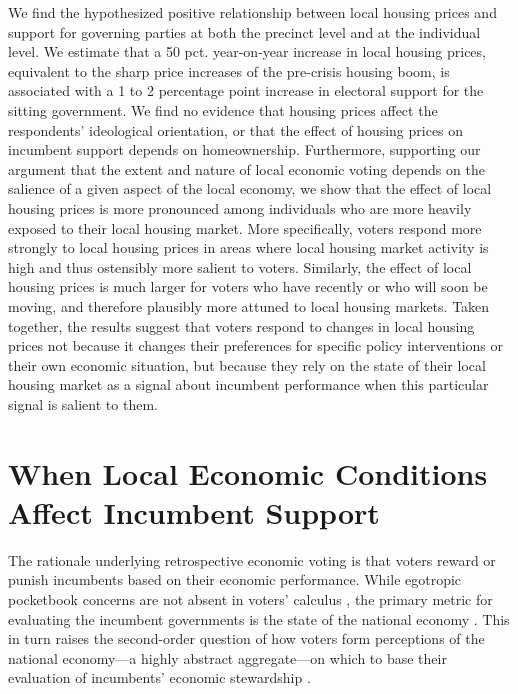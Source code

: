 \documentclass[12pt,a4paper]{article}
\begin{document}
	We find the hypothesized positive relationship between local housing prices and support for governing parties at both the precinct level and at the individual level. We estimate that a 50 pct. year-on-year increase in local housing prices, equivalent to the sharp price increases of the pre-crisis housing boom, is associated with a 1 to 2 percentage point increase in electoral support for the sitting government. We find no evidence that housing prices affect the respondents’ ideological orientation, or that the effect of housing prices on incumbent support depends on homeownership. Furthermore, supporting our argument that the extent and nature of local economic voting depends on the salience of a given aspect of the local economy, we show that the effect of local housing prices is more pronounced among individuals who are more heavily exposed to their local housing market. More specifically, voters respond more strongly to local housing prices in areas where local housing market activity is high and thus ostensibly more salient to voters. Similarly, the effect of local housing prices is much larger for voters who have recently or who will soon be moving, and therefore plausibly more attuned to local housing markets. Taken together, the results suggest that voters respond to changes in local housing prices not because it changes their preferences for specific policy interventions or their own economic situation, but because they rely on the state of their local housing market as a signal about incumbent performance when this particular signal is salient to them.
	
	\section{When Local Economic Conditions Affect Incumbent Support}
	The rationale underlying retrospective economic voting is that voters reward or punish incumbents based on their economic performance. While egotropic pocketbook concerns are not absent in voters’ calculus \citep{healy2017digging, tilley2017pound}, the primary metric for evaluating the incumbent governments is the state of the national economy \citep{kinder1979economic,lewis2013vp}. This in turn raises the second-order question of how voters form perceptions of the national economy—a highly abstract aggregate—on which to base their evaluation of incumbents’ economic stewardship \citep{reeves2012ecologies}. 
	
\end{document}
